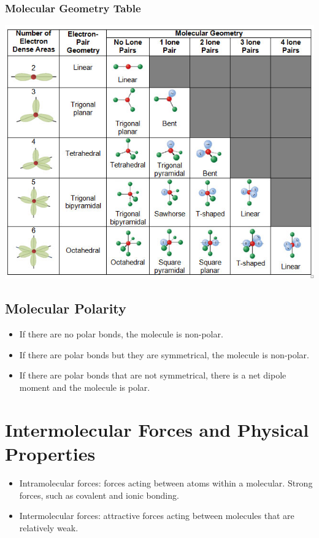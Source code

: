 \documentclass{article}
\begin{document}
\subsubsection{Molecular Geometry Table}

\begin{center}
    \includegraphics[scale=0.5]{vsepr.jpg}
\end{center}

\subsection{Molecular Polarity}

\begin{itemize}
    \item If there are no polar bonds, the molecule is non-polar.
    \item If there are polar bonds but they are symmetrical, the molecule is non-polar.
    \item If there are polar bonds that are not symmetrical, there is a net dipole moment and the molecule is polar.
\end{itemize}


\section{Intermolecular Forces and Physical Properties}

\begin{itemize}
    \item Intramolecular forces: forces acting between atoms within a molecular. Strong forces, such as covalent and ionic bonding.
    \item Intermolecular forces: attractive forces acting between molecules that are relatively weak.
\end{itemize}
\end{document}
